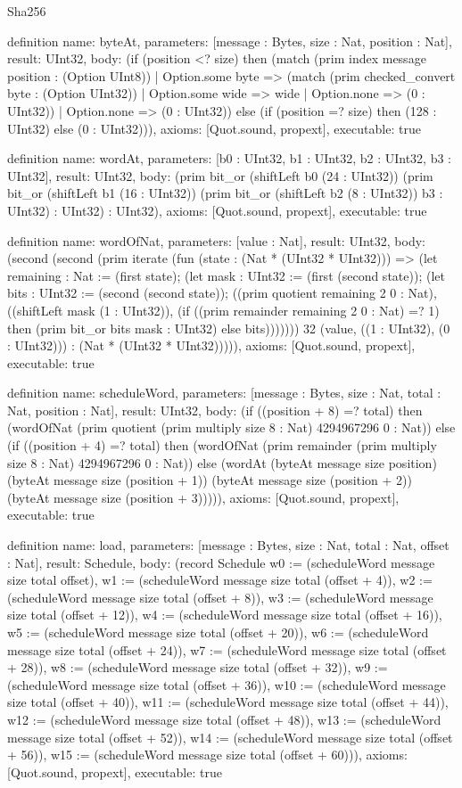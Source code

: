 \begin{lexlean}{Sha256}
\begin{semanticmodule}
definition{
  name: byteAt,
  parameters: [message : Bytes, size : Nat, position : Nat],
  result: UInt32,
  body: (if (position <? size) then (match (prim index message position : (Option UInt8))
    | Option.some byte => (match (prim checked_convert byte : (Option UInt32))
      | Option.some wide => wide
      | Option.none => (0 : UInt32))
    | Option.none => (0 : UInt32)) else (if (position =? size) then (128 : UInt32) else (0 : UInt32))),
  axioms: [Quot.sound, propext],
  executable: true
}

definition{
  name: wordAt,
  parameters: [b0 : UInt32, b1 : UInt32, b2 : UInt32, b3 : UInt32],
  result: UInt32,
  body: (prim bit_or (shiftLeft b0 (24 : UInt32)) (prim bit_or (shiftLeft b1 (16 : UInt32)) (prim bit_or (shiftLeft b2 (8 : UInt32)) b3 : UInt32) : UInt32) : UInt32),
  axioms: [Quot.sound, propext],
  executable: true
}

definition{
  name: wordOfNat,
  parameters: [value : Nat],
  result: UInt32,
  body: (second (second (prim iterate (fun (state : (Nat * (UInt32 * UInt32))) => (let remaining : Nat := (first state); (let mask : UInt32 := (first (second state)); (let bits : UInt32 := (second (second state)); ((prim quotient remaining 2 0 : Nat), ((shiftLeft mask (1 : UInt32)), (if ((prim remainder remaining 2 0 : Nat) =? 1) then (prim bit_or bits mask : UInt32) else bits))))))) 32 (value, ((1 : UInt32), (0 : UInt32))) : (Nat * (UInt32 * UInt32))))),
  axioms: [Quot.sound, propext],
  executable: true
}

definition{
  name: scheduleWord,
  parameters: [message : Bytes, size : Nat, total : Nat, position : Nat],
  result: UInt32,
  body: (if ((position + 8) =? total) then (wordOfNat (prim quotient (prim multiply size 8 : Nat) 4294967296 0 : Nat)) else (if ((position + 4) =? total) then (wordOfNat (prim remainder (prim multiply size 8 : Nat) 4294967296 0 : Nat)) else (wordAt (byteAt message size position) (byteAt message size (position + 1)) (byteAt message size (position + 2)) (byteAt message size (position + 3))))),
  axioms: [Quot.sound, propext],
  executable: true
}

definition{
  name: load,
  parameters: [message : Bytes, size : Nat, total : Nat, offset : Nat],
  result: Schedule,
  body: (record Schedule {w0 := (scheduleWord message size total offset), w1 := (scheduleWord message size total (offset + 4)), w2 := (scheduleWord message size total (offset + 8)), w3 := (scheduleWord message size total (offset + 12)), w4 := (scheduleWord message size total (offset + 16)), w5 := (scheduleWord message size total (offset + 20)), w6 := (scheduleWord message size total (offset + 24)), w7 := (scheduleWord message size total (offset + 28)), w8 := (scheduleWord message size total (offset + 32)), w9 := (scheduleWord message size total (offset + 36)), w10 := (scheduleWord message size total (offset + 40)), w11 := (scheduleWord message size total (offset + 44)), w12 := (scheduleWord message size total (offset + 48)), w13 := (scheduleWord message size total (offset + 52)), w14 := (scheduleWord message size total (offset + 56)), w15 := (scheduleWord message size total (offset + 60))}),
  axioms: [Quot.sound, propext],
  executable: true
}


\end{semanticmodule}
\end{lexlean}

